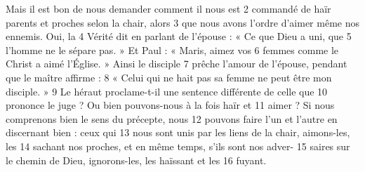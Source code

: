 Mais il est bon de nous demander comment il nous est	 
2	 	commandé de haïr parents et proches selon la chair, alors	 
3	 	que nous avons l'ordre d'aimer même nos ennemis. Oui, la	 
4	 	Vérité dit en parlant de l'épouse : « Ce que Dieu a uni, que	 
5	 	l'homme ne le sépare pas. » Et Paul : « Maris, aimez vos	 
6	 	femmes comme le Christ a aimé l'Église. » Ainsi le disciple	 
7	 	prêche l'amour de l'épouse, pendant que le maître affirme :	 
8	 	« Celui qui ne hait pas sa femme ne peut être mon disciple. »	 
9	 	Le héraut proclame-t-il une sentence différente de celle que	 
10	 	prononce le juge ? Ou bien pouvons-nous à la fois haïr et	 
11	 	aimer ? Si nous comprenons bien le sens du précepte, nous	 
12	 	pouvons faire l'un et l'autre en discernant bien : ceux qui	 
13	 	nous sont unis par les liens de la chair, aimons-les, les	 
14	 	sachant nos proches, et en même temps, s'ils sont nos adver-	 
15	 	saires sur le chemin de Dieu, ignorons-les, les haïssant et les	 
16	 	fuyant.